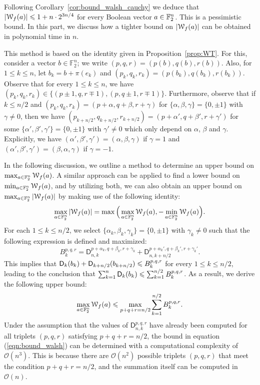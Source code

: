\documentclass[11pt]{llncs}
\begin{document}
Following Corollary~\ref{cor:bound_walsh_cauchy} we deduce that $|\wt f(a)|\leq 1+n\cdot 2^{3n/4}$ for every Boolean vector $a\in\F_2^n$. This is a pessimistic bound. In this part, we discuss how a tighter bound on $|\wt f(a)|$ can be obtained in polynomial time in $n$.

This method is based on the identity given in Proposition~\ref{prop:WT}.
For this, consider a vector $b\in\mathbb F_2^n$; we write $(p,q,r)=(p(b),q(b),r(b))$. Also, for $1\leq k\leq n$, let $b_k=b+\pi(e_k)$ and $(p_k,q_k,r_k)=(p(b_k),q(b_k),r(b_k))$. Observe that for every $1\leq k\leq n$, we have $(p_k,q_k,r_k)\in\{(p\pm1,q,r\mp 1),(p,q\pm 1,r\mp 1)\}$. Furthermore, observe that if $k\leq n/2$ and $(p_k,q_k,r_k)=(p+\alpha,q+\beta,r+\gamma)$ for $\{\alpha,\beta,\gamma\}=\{0,\pm 1\}$ with $\gamma\neq 0$, then we have $(p_{k+n/2},q_{k+n/2},r_{k+n/2})=(p+\alpha',q+\beta',r+\gamma')$ for some $\{\alpha',\beta',\gamma'\}=\{0,\pm 1\}$ with $\gamma'\neq 0$ which only depend on $\alpha$, $\beta$ and $\gamma$. Explicitly, we have $(\alpha',\beta',\gamma')=(\alpha,\beta,\gamma)$ if $\gamma=1$ and $(\alpha',\beta',\gamma')=(\beta,\alpha,\gamma)$ if $\gamma=-1$.

In the following discussion, we outline a method to determine an upper bound on $\max_{a\in\F_2^n}\wt f(a)$. A similar approach can be applied to find a lower bound on $\min_{a\in\F_2^n}\wt f(a)$, and by utilizing both, we can also obtain an upper bound on $\max_{a\in\F_2^n}|\wt f(a)|$ by making use of the following identity:
\[
\max_{a\in\F_2^n}|\wt f(a)|=\max\Big(\max_{a\in\F_2^n}\wt f(a),-\min_{a\in\F_2^n}\wt f(a)\Big).
\]
For each $1\leq k\leq n/2$, we select $\{\alpha_k,\beta_k,\gamma_k\}=\{0,\pm 1\}$ with $\gamma_k\neq 0$ such that the following expression is defined and maximized:
\[
B_k^{p,q,r}=\mathsf D_{n,k}^{p+\alpha_k,q+\beta_k,r+\gamma_k}+\mathsf D_{n,k+n/2}^{p+\alpha_k',q+\beta_k',r+\gamma_k'}.
\]
This implies that $\Dnka{n}{k}{b_k}+\Dnka{n}{k+n/2}{b_{k+n/2}}\leq B_k^{p,q,r}$ for every $1\leq k\leq n/2$, leading to the conclusion that $\sum_{k=1}^n\Dnka nk{b_k}\leq\sum_{k=1}^{n/2} B_k^{p,q,r}$. As a result, we derive the following upper bound:
\begin{equation}\label{eqn:bound_walsh}
\max_{a\in\F_2^n}\wt f(a)\leq\max_{p+q+r=n/2}\sum_{k=1}^{n/2} B_k^{p,q,r}.
\end{equation}
Under the assumption that the values of $\mathsf{D}_{n,k}^{p,q,r}$ have already been computed for all triplets $(p,q,r)$ satisfying $p+q+r=n/2$, the bound in equation (\ref{eqn:bound_walsh}) can be determined with a computational complexity of $\mathcal{O}(n^3)$. This is because there are $\mathcal{O}(n^2)$ possible triplets $(p,q,r)$ that meet the condition $p+q+r=n/2$, and the summation itself can be computed in $\mathcal{O}(n)$.
\end{document}
